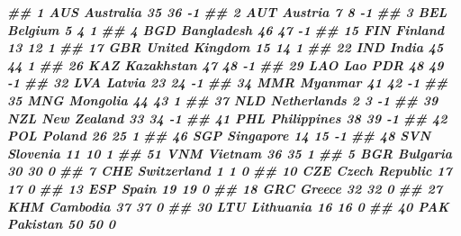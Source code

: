 \documentclass[
]{book}
\newenvironment{Shaded}{\begin{snugshade}}{\end{snugshade}}
\newcommand{\DocumentationTok}[1]{\textcolor[rgb]{0.56,0.35,0.01}{\textbf{\textit{#1}}}}
\begin{document}
\begin{Shaded}
\begin{Highlighting}[]
\DocumentationTok{\#\# 1       AUS          Australia            35               36         {-}1}
\DocumentationTok{\#\# 2       AUT            Austria             7                8         {-}1}
\DocumentationTok{\#\# 3       BEL            Belgium             5                4          1}
\DocumentationTok{\#\# 4       BGD         Bangladesh            46               47         {-}1}
\DocumentationTok{\#\# 15      FIN            Finland            13               12          1}
\DocumentationTok{\#\# 17      GBR     United Kingdom            15               14          1}
\DocumentationTok{\#\# 22      IND              India            45               44          1}
\DocumentationTok{\#\# 26      KAZ         Kazakhstan            47               48         {-}1}
\DocumentationTok{\#\# 29      LAO            Lao PDR            48               49         {-}1}
\DocumentationTok{\#\# 32      LVA             Latvia            23               24         {-}1}
\DocumentationTok{\#\# 34      MMR            Myanmar            41               42         {-}1}
\DocumentationTok{\#\# 35      MNG           Mongolia            44               43          1}
\DocumentationTok{\#\# 37      NLD        Netherlands             2                3         {-}1}
\DocumentationTok{\#\# 39      NZL        New Zealand            33               34         {-}1}
\DocumentationTok{\#\# 41      PHL        Philippines            38               39         {-}1}
\DocumentationTok{\#\# 42      POL             Poland            26               25          1}
\DocumentationTok{\#\# 46      SGP          Singapore            14               15         {-}1}
\DocumentationTok{\#\# 48      SVN           Slovenia            11               10          1}
\DocumentationTok{\#\# 51      VNM            Vietnam            36               35          1}
\DocumentationTok{\#\# 5       BGR           Bulgaria            30               30          0}
\DocumentationTok{\#\# 7       CHE        Switzerland             1                1          0}
\DocumentationTok{\#\# 10      CZE     Czech Republic            17               17          0}
\DocumentationTok{\#\# 13      ESP              Spain            19               19          0}
\DocumentationTok{\#\# 18      GRC             Greece            32               32          0}
\DocumentationTok{\#\# 27      KHM           Cambodia            37               37          0}
\DocumentationTok{\#\# 30      LTU          Lithuania            16               16          0}
\DocumentationTok{\#\# 40      PAK           Pakistan            50               50          0}

\end{Highlighting}
\end{Shaded}
\end{document}
